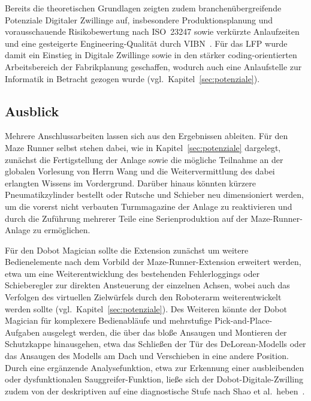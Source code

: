 Bereits die theoretischen Grundlagen zeigten zudem branchenübergreifende Potenziale Digitaler Zwillinge auf, insbesondere Produktionsplanung und vorausschauende Risikobewertung nach ISO~23247 sowie verkürzte Anlaufzeiten und eine gesteigerte Engineering-Qualität durch VIBN~\cite{iso23247,lechler2019}. Für das LFP wurde damit ein Einstieg in Digitale Zwillinge sowie in den stärker coding-orientierten Arbeitsbereich der Fabrikplanung geschaffen, wodurch auch eine Anlaufstelle zur Informatik in Betracht gezogen wurde (vgl.\ Kapitel~\ref{sec:potenziale}).

\subsection{Ausblick}
Mehrere Anschlussarbeiten lassen sich aus den Ergebnissen ableiten.
Für den Maze Runner selbst stehen dabei, wie in Kapitel~\ref{sec:potenziale} dargelegt, zunächst die Fertigstellung der Anlage sowie die mögliche Teilnahme an der globalen Vorlesung von Herrn Wang und die Weitervermittlung des dabei erlangten Wissens im Vordergrund.
Darüber hinaus könnten kürzere Pneumatikzylinder bestellt oder Rutsche und Schieber neu dimensioniert werden, um die vorerst nicht verbauten Turmmagazine der Anlage zu reaktivieren und durch die Zuführung mehrerer Teile eine Serienproduktion auf der Maze-Runner-Anlage zu ermöglichen.

Für den Dobot Magician sollte die Extension zunächst um weitere Bedienelemente nach dem Vorbild der Maze-Runner-Extension erweitert werden, etwa um eine Weiterentwicklung des bestehenden Fehlerloggings oder Schieberegler zur direkten Ansteuerung der einzelnen Achsen, wobei auch das Verfolgen des virtuellen Zielwürfels durch den Roboterarm weiterentwickelt werden sollte (vgl.\ Kapitel~\ref{sec:potenziale}).
Des Weiteren könnte der Dobot Magician für komplexere Bedienabläufe und mehrstufige Pick-and-Place-Aufgaben ausgelegt werden, die über das bloße Ansaugen und Montieren der Schutzkappe hinausgehen, etwa das Schließen der Tür des DeLorean-Modells oder das Ansaugen des Modells am Dach und Verschieben in eine andere Position.
Durch eine ergänzende Analysefunktion, etwa zur Erkennung einer ausbleibenden oder dysfunktionalen Sauggreifer-Funktion, ließe sich der Dobot-Digitale-Zwilling zudem von der deskriptiven auf eine diagnostische Stufe nach Shao et al.\ heben~\cite{shao2023standardized}.

